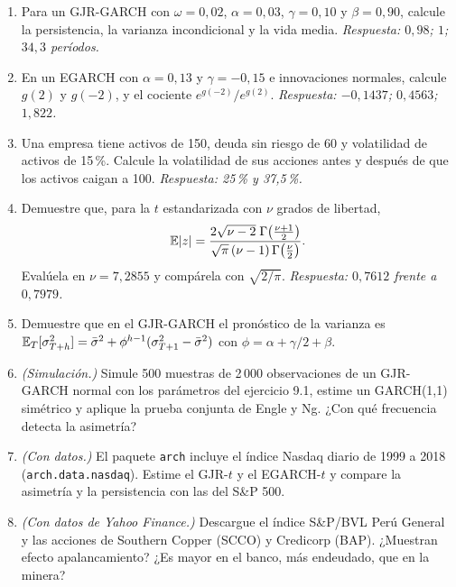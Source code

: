 \begin{enumerate}[label=\textbf{\thechapter.\arabic*},leftmargin=*,itemsep=6pt]
  \item Para un GJR-GARCH con $\omega=0{,}02$, $\alpha=0{,}03$, $\gamma=0{,}10$ y $\beta=0{,}90$, calcule la
  persistencia, la varianza incondicional y la vida media. \textit{Respuesta: $0{,}98$; $1$; $34{,}3$ períodos.}

  \item En un EGARCH con $\alpha=0{,}13$ y $\gamma=-0{,}15$ e innovaciones normales, calcule $g(2)$ y $g(-2)$, y el
  cociente $e^{g(-2)}/e^{g(2)}$. \textit{Respuesta: $-0{,}1437$; $0{,}4563$; $1{,}822$.}

  \item Una empresa tiene activos de 150, deuda sin riesgo de 60 y volatilidad de activos de 15\,\%. Calcule la
  volatilidad de sus acciones antes y después de que los activos caigan a 100. \textit{Respuesta: 25\,\% y
  37,5\,\%.}

  \item Demuestre que, para la $t$ estandarizada con $\nu$ grados de libertad,
  \[
    \mathbb{E}|z|=\frac{2\sqrt{\nu-2}\;\Gamma\bigl(\frac{\nu+1}2\bigr)}{\sqrt\pi\,(\nu-1)\,\Gamma\bigl(\frac\nu2\bigr)} .
  \]
  Evalúela en $\nu=7{,}2855$ y compárela con $\sqrt{2/\pi}$. \textit{Respuesta: $0{,}7612$ frente a $0{,}7979$.}

  \item Demuestre que en el GJR-GARCH el pronóstico de la varianza es
  $\mathbb{E}_T[\sigma_{T+h}^2]=\bar\sigma^2+\phi^{h-1}(\sigma_{T+1}^2-\bar\sigma^2)$ con $\phi=\alpha+\gamma/2+\beta$.

  \item \emph{(Simulación.)} Simule 500 muestras de 2\,000 observaciones de un GJR-GARCH normal con los
  parámetros del ejercicio 9.1, estime un GARCH(1,1) simétrico y aplique la prueba conjunta de Engle y Ng. ¿Con
  qué frecuencia detecta la asimetría?

  \item \emph{(Con datos.)} El paquete \texttt{arch} incluye el índice Nasdaq diario de 1999 a 2018
  (\texttt{arch.data.nasdaq}). Estime el GJR-$t$ y el EGARCH-$t$ y compare la asimetría y la persistencia con las
  del S\&P 500.

  \item \emph{(Con datos de Yahoo Finance.)} Descargue el índice S\&P/BVL Perú General y las acciones de
  Southern Copper (SCCO) y Credicorp (BAP). ¿Muestran efecto apalancamiento? ¿Es mayor en el banco, más
  endeudado, que en la minera?
\end{enumerate}

